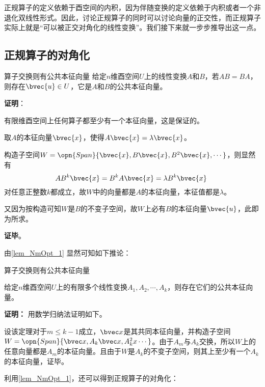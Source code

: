 正规算子的定义依赖于酉空间的内积，因为伴随变换的定义依赖于内积或者一个非退化双线性形式。因此，讨论正规算子的同时可以讨论向量的正交性，而正规算子实际上就是“可以被正交对角化的线性变换”。我们接下来就一步步推导出这一点。

\subsection{正规算子的对角化}

\begin{lemma}{算子交换则有公共本征向量}\label{lem_NmOpt_1}
给定$n$维酉空间$U$上的线性变换$A$和$B$，若$AB=BA$，则存在$\bvec{u}\in U$，它是$A$和$B$的公共本征向量。
\end{lemma}


\textbf{证明}：

有限维酉空间上任何算子都至少有一个本征向量，这是保证的。

取$A$的本征向量$\bvec{x}$，使得$A\bvec{x}=\lambda\bvec{x}$。

构造子空间$W=\opn{Span}\{\bvec{x}, B\bvec{x}, B^2\bvec{x}, \cdots\}$，则显然有
\begin{equation}
AB^k\bvec{x} = B^kA\bvec{x} = \lambda B^k\bvec{x}~
\end{equation}
对任意正整数$k$都成立，故$W$中的向量都是$A$的本征向量，本征值都是$\lambda$。

又因为按构造可知$W$是$B$的不变子空间，故$W$上必有$B$的本征向量$\bvec{u}$，此即为所求。

\textbf{证毕}。



由\autoref{lem_NmOpt_1} 显然可知如下推论：

\begin{corollary}{算子交换则有公共本征向量}\label{cor_NmOpt_1}

给定$n$维酉空间$U$上的有限多个线性变换$A_1, A_2, \cdots, A_k$，则存在它们的公共本征向量。

\end{corollary}
\textbf{证明：}
用数学归纳法证明如下。

设该定理对于$m\leq k-1$成立，$\bvec x$是其共同本征向量，并构造子空间$W=\opn{Span}\{\bvec x,A_{k}\bvec x,A_{k}^2x\cdots\}$。由于$A_m$与$A_k$交换，所以$W$上的任意向量都是$A_m$的本征向量。且由于$W$是$A_k$的不变子空间，则其上至少有一个$A_k$的本征向量，证毕。



利用\autoref{lem_NmOpt_1}，还可以得到正规算子的对角化：


